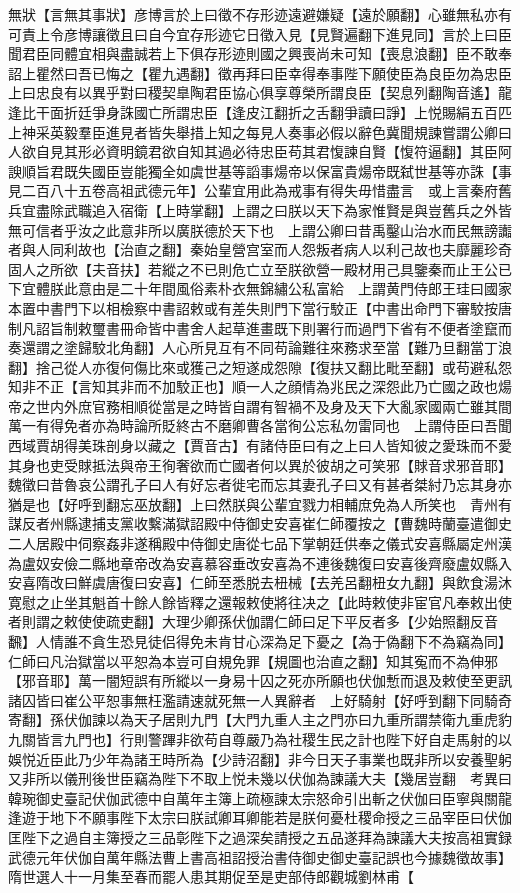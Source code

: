 無狀【言無其事狀】彦博言於上曰徵不存形迹遠避嫌疑【遠於願翻】心雖無私亦有可責上令彦博讓徵且曰自今宜存形迹它日徵入見【見賢遍翻下進見同】言於上曰臣聞君臣同體宜相與盡誠若上下俱存形迹則國之興喪尚未可知【喪息浪翻】臣不敢奉詔上瞿然曰吾已悔之【瞿九遇翻】徵再拜曰臣幸得奉事陛下願使臣為良臣勿為忠臣上曰忠良有以異乎對曰稷契臯陶君臣協心俱享尊榮所謂良臣【契息列翻陶音遙】龍逢比干面折廷爭身誅國亡所謂忠臣【逢皮江翻折之舌翻爭讀曰諍】上悦賜絹五百匹上神采英毅羣臣進見者皆失舉措上知之每見人奏事必假以辭色冀聞規諫嘗謂公卿曰人欲自見其形必資明鏡君欲自知其過必待忠臣苟其君愎諫自賢【愎符逼翻】其臣阿諛順旨君既失國臣豈能獨全如虞世基等謟事煬帝以保富貴煬帝既弑世基等亦誅【事見二百八十五卷高祖武德元年】公輩宜用此為戒事有得失毋惜盡言　或上言秦府舊兵宜盡除武職追入宿衛【上時掌翻】上謂之曰朕以天下為家惟賢是與豈舊兵之外皆無可信者乎汝之此意非所以廣朕德於天下也　上謂公卿曰昔禹鑿山治水而民無謗讟者與人同利故也【治直之翻】秦始皇營宫室而人怨叛者病人以利己故也夫靡麗珍奇固人之所欲【夫音扶】若縱之不已則危亡立至朕欲營一殿材用己具鑒秦而止王公已下宜體朕此意由是二十年間風俗素朴衣無錦繡公私富給　上謂黄門侍郎王珪曰國家本置中書門下以相檢察中書詔敕或有差失則門下當行駮正【中書出命門下審駮按唐制凡詔旨制敕璽書冊命皆中書舍人起草進畫既下則署行而過門下省有不便者塗竄而奏還謂之塗歸駮北角翻】人心所見互有不同苟論難往來務求至當【難乃旦翻當丁浪翻】捨己從人亦復何傷比來或獲己之短遂成怨隙【復扶又翻比毗至翻】或苟避私怨知非不正【言知其非而不加駮正也】順一人之顔情為兆民之深怨此乃亡國之政也煬帝之世内外庶官務相順從當是之時皆自謂有智禍不及身及天下大亂家國兩亡雖其間萬一有得免者亦為時論所貶終古不磨卿曹各當徇公忘私勿雷同也　上謂侍臣曰吾聞西域賈胡得美珠剖身以藏之【賈音古】有諸侍臣曰有之上曰人皆知彼之愛珠而不愛其身也吏受賕抵法與帝王徇奢欲而亡國者何以異於彼胡之可笑邪【賕音求邪音耶】魏徵曰昔魯哀公謂孔子曰人有好忘者徙宅而忘其妻孔子曰又有甚者桀紂乃忘其身亦猶是也【好呼到翻忘巫放翻】上曰然朕與公輩宜戮力相輔庶免為人所笑也　青州有謀反者州縣逮捕支黨收繫滿獄詔殿中侍御史安喜崔仁師覆按之【曹魏時蘭臺遣御史二人居殿中伺察姦非遂稱殿中侍御史唐從七品下掌朝廷供奉之儀式安喜縣屬定州漢為盧奴安儉二縣地章帝改為安喜慕容垂改安喜為不連後魏復曰安喜後齊廢盧奴縣入安喜隋改曰鮮虞唐復曰安喜】仁師至悉脱去杻械【去羌呂翻杻女九翻】與飲食湯沐寛慰之止坐其魁首十餘人餘皆釋之還報敕使將往决之【此時敕使非宦官凡奉敕出使者則謂之敕使使疏吏翻】大理少卿孫伏伽謂仁師曰足下平反者多【少始照翻反音飜】人情誰不貪生恐見徒侣得免未肯甘心深為足下憂之【為于偽翻下不為竊為同】仁師曰凡治獄當以平恕為本豈可自規免罪【規圖也治直之翻】知其寃而不為伸邪【邪音耶】萬一闇短誤有所縱以一身易十囚之死亦所願也伏伽慙而退及敕使至更訊諸囚皆曰崔公平恕事無枉濫請速就死無一人異辭者　上好騎射【好呼到翻下同騎奇寄翻】孫伏伽諫以為天子居則九門【大門九重人主之門亦曰九重所謂禁衛九重虎豹九關皆言九門也】行則警蹕非欲苟自尊嚴乃為社稷生民之計也陛下好自走馬射的以娛悦近臣此乃少年為諸王時所為【少詩沼翻】非今日天子事業也既非所以安養聖躬又非所以儀刑後世臣竊為陛下不取上悦未幾以伏伽為諫議大夫【幾居豈翻　考異曰韓琬御史臺記伏伽武德中自萬年主簿上疏極諫太宗怒命引出斬之伏伽曰臣寧與關龍逢遊于地下不願事陛下太宗曰朕試卿耳卿能若是朕何憂杜稷命授之三品宰臣曰伏伽匡陛下之過自主簿授之三品彰陛下之過深矣請授之五品遂拜為諫議大夫按高祖實録武德元年伏伽自萬年縣法曹上書高祖詔授治書侍御史御史臺記誤也今據魏徵故事】　隋世選人十一月集至春而罷人患其期促至是吏部侍郎觀城劉林甫【
